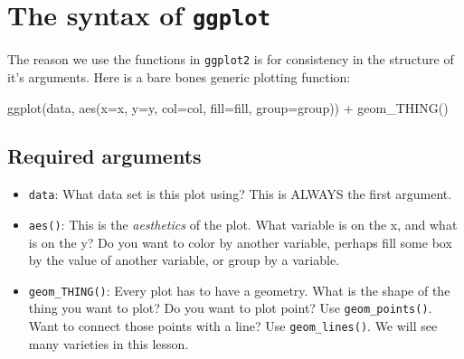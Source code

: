 \documentclass[
  letterpaper,
  DIV=11,
  numbers=noendperiod,
  oneside]{scrreprt}
\newenvironment{Shaded}{\begin{snugshade}}{\end{snugshade}}
\newcommand{\AttributeTok}[1]{\textcolor[rgb]{0.40,0.45,0.13}{#1}}
\newcommand{\FunctionTok}[1]{\textcolor[rgb]{0.28,0.35,0.67}{#1}}
\newcommand{\NormalTok}[1]{\textcolor[rgb]{0.00,0.23,0.31}{#1}}
\newcommand{\SpecialCharTok}[1]{\textcolor[rgb]{0.37,0.37,0.37}{#1}}
\providecommand{\tightlist}{%
  \setlength{\itemsep}{0pt}\setlength{\parskip}{0pt}}\usepackage{longtable,booktabs,array}
\begin{document}
\section{\texorpdfstring{The syntax of
\texttt{ggplot}}{The syntax of ggplot}}\label{the-syntax-of-ggplot}

The reason we use the functions in \texttt{ggplot2} is for consistency
in the structure of it's arguments. Here is a bare bones generic
plotting function:

\begin{Shaded}
\begin{Highlighting}[]
\FunctionTok{ggplot}\NormalTok{(data, }\FunctionTok{aes}\NormalTok{(}\AttributeTok{x=}\NormalTok{x, }\AttributeTok{y=}\NormalTok{y, }\AttributeTok{col=}\NormalTok{col, }\AttributeTok{fill=}\NormalTok{fill, }\AttributeTok{group=}\NormalTok{group)) }\SpecialCharTok{+}  \FunctionTok{geom\_THING}\NormalTok{() }
\end{Highlighting}
\end{Shaded}

\subsection*{Required arguments}\label{required-arguments}

\begin{itemize}
\tightlist
\item
  \texttt{data}: What data set is this plot using? This is ALWAYS the
  first argument.
\item
  \texttt{aes()}: This is the \emph{aesthetics} of the plot. What
  variable is on the x, and what is on the y? Do you want to color by
  another variable, perhaps fill some box by the value of another
  variable, or group by a variable.
\item
  \texttt{geom\_THING()}: Every plot has to have a geometry. What is the
  shape of the thing you want to plot? Do you want to plot point? Use
  \texttt{geom\_points()}. Want to connect those points with a line? Use
  \texttt{geom\_lines()}. We will see many varieties in this lesson.
\end{itemize}
\end{document}
